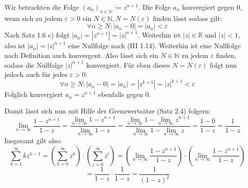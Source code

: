 \documentclass[a4paper,graphics,11pt]{article}
\begin{document}
Wir betrachten die Folge $(a_n)_{n\in \mathbb{N}} := z^{n+1}$.
Die Folge $a_n$ konvergiert gegen 0, wenn sich zu jedem $\varepsilon > 0$ ein 
$N \in \mathbb{N}, N = N(\varepsilon)$ finden lässt sodass gilt:
$$
    \forall n \geq N\colon |a_n - 0| = |a_n| < \varepsilon
$$
Nach Satz 1.6 c) folgt $|a_n| = |z^{n+1}| = |z|^{n+1}$. Weiterhin ist $|z| \in \mathbb{R}$
und $|z| < 1$, also ist $|a_n| = |z|^{n+1}$ eine Nullfolge nach (III 1.14). Weiterhin
ist eine Nullfolge nach Definition auch konvergent. Also lässt sich ein $N\in \mathbb{N}$ 
zu jedem $\varepsilon$ finden, sodass die Nullfolge $|z|^{n+1}$ konvergiert.
Für eben dieses $N = N(\varepsilon)$ folgt nun jedoch auch für jedes $\varepsilon > 0\colon$
$$
    \forall n \geq N \colon |a_n - 0| = |a_n| = |z^{k+1}| = |z|^{k+1} < \varepsilon
$$
Folglich konvergiert $a_n = z^{n+1}$ ebenfalls gegen 0.

Damit lässt sich nun mit Hilfe der Grenzwertsätze (Satz 2.4) folgern:
$$
    \lim_{n \to \infty} \frac{1-z^{n+1}}{1-z}
    = \frac{\lim_{n \to \infty}\limits 1-z^{n+1}}{\lim_{n \to \infty}\limits 1-z}
    = \frac{\lim_{n \to \infty}\limits 1-\lim_{n \to \infty}\limits z^{n+1}}
        {\lim_{n \to \infty}\limits1- \lim_{n \to \infty}\limits z}
    =\frac{1-0}{1-z} = \frac{1}{1-z}
$$
Insgesamt gilt also:
$$
    \sum_{k=1}^{\infty} kz^{k-1}
    =\left(\sum_{k=0}^{\infty} z^k\right)\cdot\left(\sum_{i=0}^{\infty}z^i\right)
    = \left(\lim_{n \to \infty} \frac{1-z^{n+1}}{1-z}\right)\cdot\left(\lim_{n \to \infty} \frac{1-z^{n+1}}{1-z}\right)
$$$$
    = \frac{1}{1-z} \cdot \frac{1}{1-z} = \frac{1}{(1-z)^2}
$$
\end{document}
